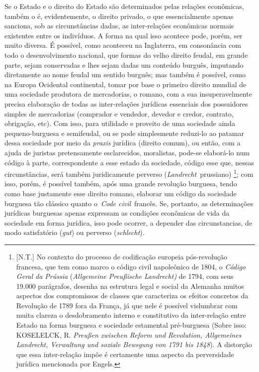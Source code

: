 Se o Estado e o direito do Estado são determinados pelas relações
econômicas, também o é, evidentemente, o direito privado, o que
essencialmente apenas sanciona, sob as circunstâncias dadas, as
inter-relações econômicas normais existentes entre os indivíduos. A
forma na qual isso acontece pode, porém, ser muito diversa. É possível,
como aconteceu na Inglaterra, em consonância com todo o desenvolvimento
nacional, que formas do velho direito feudal, em grande parte, sejam
conservadas e lhes sejam dadas um conteúdo burguês, imputando
diretamente ao nome feudal um sentido burguês; mas também é possível,
como na Europa Ocidental continental, tomar por base o primeiro direito
mundial de uma sociedade produtora de mercadorias, o romano, com a sua
insuperavelmente precisa elaboração de todas as inter-relações jurídicas
essenciais dos possuidores simples de mercadorias (comprador e vendedor,
devedor e credor, contrato, obrigação, etc). Com isso, para utilidade e
proveito de uma sociedade ainda pequeno-burguesa e semifeudal, ou se
pode simplesmente reduzi-lo ao patamar dessa sociedade por meio da
\emph{praxis} jurídica (direito comum), ou então, com a ajuda de
juristas pretensamente esclarecidos, moralistas, pode-se elaborá-lo num
código à parte, correspondente a esse estado da sociedade, código esse
que, nessas circunstâncias, será também juridicamente perverso
(\emph{Landrecht}\protect\hypertarget{r34}{}{}~prussiano) \footnote{{[}N.T.{]}
  No contexto do processo de codificação europeia pós-revolução
  francesa, que tem como marco o código civil napoleônico de 1804, o
  \emph{Código Geral da Prússia} (\emph{Allgemeine Preußische
  Landrecht)} de 1794, com seus 19.000 parágrafos, desenha na estrutura
  legal e social da Alemanha muitos aspectos dos compromissos de classes
  que caracteriza os efeitos concretos da Revolução de 1789 fora da
  França, já que nele é possível vislumbrar com muita clareza o
  desdobramento interno e constitutivo da inter-relação entre Estado na
  forma burguesa e sociedade estamental pré-burguesa (Sobre isso:
  KOSELELCK, R. \emph{Preußen zwischen Reform und Revolution,
  Allgemeines Landrecht, Verwaltung und soziale Bewegung von 1791 bis
  1848}). A distorção que essa inter-relação impõe é certamente uma
  aspecto da perversidade jurídica mencionada por Engels.}; com isso,
porém, é possível também, após uma grande revolução burguesa, tendo como
base justamente esse direito romano, elaborar um código da sociedade
burguesa tão clássico quanto o~\emph{Code
civil}\protect\hypertarget{r35}{}{}~francês. Se, portanto, as
determinações jurídicas burguesas apenas expressam as condições
econômicas de vida da sociedade em forma jurídica, isso pode ocorrer, a
depender das circunstancias, de modo satisfatório (\emph{gut}) ou
perverso (\emph{schlecht}).

